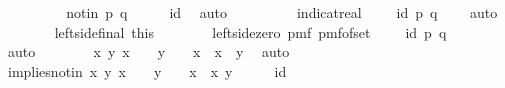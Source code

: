 \begin{isabellebody}
\ \ \ \ \ \ \isamarkupfalse%
\ \isamarkupfalse%
\ not{\isacharunderscore}{\kern0pt}in{\isacharcolon}{\kern0pt}\ {\isachardoublequoteopen}{\isacharparenleft}{\kern0pt}p{\isacharcomma}{\kern0pt}\ q{\isacharparenright}{\kern0pt}\ {\isasymnotin}\ {\isasymK}\ {\isasymtimes}\ {\isasymK}\ {\isacharminus}{\kern0pt}\ {\isacharquery}{\kern0pt}id{\isachardoublequoteclose}\ \isamarkupfalse%
\ auto\isanewline
\ \ \ \ \ \ \isamarkupfalse%
\ \isamarkupfalse%
\ {\isachardoublequoteopen}indicat{\isacharunderscore}{\kern0pt}real\ {\isacharparenleft}{\kern0pt}{\isasymK}\ {\isasymtimes}\ {\isasymK}\ {\isacharminus}{\kern0pt}\ {\isacharquery}{\kern0pt}id{\isacharparenright}{\kern0pt}\ {\isacharparenleft}{\kern0pt}p{\isacharcomma}{\kern0pt}\ q{\isacharparenright}{\kern0pt}\ {\isacharequal}{\kern0pt}\ {}{\isachardoublequoteclose}\ \isamarkupfalse%
\ auto\isanewline
\ \ \ \ \ \ \isamarkupfalse%
\ left{\isacharunderscore}{\kern0pt}side{\isacharunderscore}{\kern0pt}final\ this\isanewline
\ \ \ \ \ \ \isamarkupfalse%
\ left{\isacharunderscore}{\kern0pt}side{\isacharunderscore}{\kern0pt}zero{\isacharcolon}{\kern0pt}\ {\isachardoublequoteopen}pmf\ {\isacharparenleft}{\kern0pt}pmf{\isacharunderscore}{\kern0pt}of{\isacharunderscore}{\kern0pt}set\ {\isacharparenleft}{\kern0pt}{\isasymK}\ {\isasymtimes}\ {\isasymK}\ {\isacharminus}{\kern0pt}\ {\isacharquery}{\kern0pt}id{\isacharparenright}{\kern0pt}{\isacharparenright}{\kern0pt}\ {\isacharparenleft}{\kern0pt}p{\isacharcomma}{\kern0pt}\ q{\isacharparenright}{\kern0pt}\ {\isacharequal}{\kern0pt}\ {}{\isachardoublequoteclose}\ \isamarkupfalse%
\ auto\isanewline
\isanewline
\ \ \ \ \ \ \isamarkupfalse%
\ {\isachardoublequoteopen}{\isasymAnd}x\ y{\isachardot}{\kern0pt}\ x\ {\isasymin}\ {\isasymK}\ {\isasymLongrightarrow}\ y\ {\isasymin}\ {\isasymK}\ {\isacharminus}{\kern0pt}\ {\isacharbraceleft}{\kern0pt}x{\isacharbraceright}{\kern0pt}\ {\isasymLongrightarrow}\ x\ {\isasymnoteq}\ y{\isachardoublequoteclose}\ \isamarkupfalse%
\ auto\isanewline
\ \ \ \ \ \ \isamarkupfalse%
\ \isamarkupfalse%
\ implies{\isacharunderscore}{\kern0pt}notin{\isacharcolon}{\kern0pt}\ {\isachardoublequoteopen}{\isasymAnd}x\ y{\isachardot}{\kern0pt}\ x\ {\isasymin}\ {\isasymK}\ {\isasymLongrightarrow}\ y\ {\isasymin}\ {\isasymK}\ {\isacharminus}{\kern0pt}\ {\isacharbraceleft}{\kern0pt}x{\isacharbraceright}{\kern0pt}\ {\isasymLongrightarrow}\ {\isacharparenleft}{\kern0pt}x{\isacharcomma}{\kern0pt}\ y{\isacharparenright}{\kern0pt}\ {\isasymin}\ {\isasymK}\ {\isasymtimes}\ {\isasymK}\ {\isacharminus}{\kern0pt}\ {\isacharquery}{\kern0pt}id{\isachardoublequoteclose}\isanewline

\end{isabellebody}
